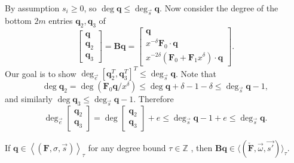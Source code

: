 \begin{pf}
By assumption $s_{i}\ge0$, so $\deg\mathbf{q}\le\deg_{\vec{s}}\mathbf{q}.$
Now consider the degree of the bottom $2m$ entries $\mathbf{q}_{2},\mathbf{q}_{3}$
of \[
\begin{bmatrix}\mathbf{q}\\
\mathbf{q}_{2}\\
\mathbf{q}_{3}\end{bmatrix}=\mathbf{B}\mathbf{q}=\left[\begin{array}{r}
\mathbf{q}\\
x^{-\delta}\mathbf{F}_{0}\cdot\mathbf{q}\\
x^{-2\delta}\left(\mathbf{F}_{0}+\mathbf{F}_{1}x^{\delta}\right)\cdot\mathbf{q}\end{array}\right].\]
 Our goal is to show $\deg_{\vec{e}}\left[\mathbf{q}_{2}^{T},\mathbf{q}_{3}^{T}\right]^{T}\le\deg_{\vec{s}}\mathbf{q}$.
Note that \[
\deg\mathbf{q}_{2}=\deg\left(\mathbf{F}_{0}\mathbf{q}/x^{\delta}\right)\le\deg\mathbf{q}+\delta-1-\delta\le\deg_{\vec{s}}\mathbf{q}-1,\]
 and similarly $\deg\mathbf{q}_{3}\le\deg_{\vec{s}}\mathbf{q}-1$.
Therefore \[
\deg_{\vec{e}}\begin{bmatrix}\mathbf{q}_{2}\\
\mathbf{q}_{3}\end{bmatrix}=\deg\begin{bmatrix}\mathbf{q}_{2}\\
\mathbf{q}_{3}\end{bmatrix}+e\le\deg_{\vec{s}}\mathbf{q}-1+e\le\deg_{\vec{s}}\mathbf{q}.\]
 \end{pf}
\begin{cor}
\label{cor:sToBs}If $\mathbf{q}\in\left\langle \left(\mathbf{F},\sigma,\vec{s}\right)\right\rangle _{\tau}$
for any degree bound $\tau\in\mathbb{Z}$ , then\textup{ }$\mathbf{B}\mathbf{q}\in\langle(\check{\mathbf{F}},\vec{\omega},\vec{s'})\rangle_{\tau}$\textup{.}
\end{cor}

